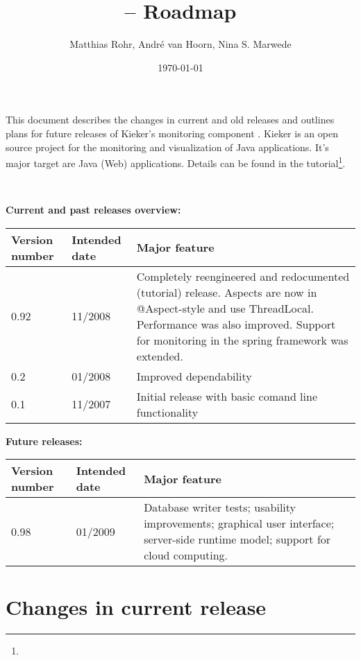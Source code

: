\documentclass{scrartcl}
\title{\kieker -- Roadmap}
\date{\today \\ \kiekerurl{roadmap.pdf}}
\author{Matthias Rohr, Andr\'{e} van Hoorn, Nina S. Marwede}
\begin{document}
\maketitle
\noindent
This document describes the changes in current and old releases and outlines plans for future releases of Kieker's monitoring component \tpmon{}. Kieker is an open source project
for the monitoring and visualization of Java applications. It's major target are Java (Web) applications. Details can be found in the tutorial\footnote{\kiekertutorialurl}.

\

\noindent \large{\textbf{Current and past releases overview:}}
\begin{center}%
 \begin{tabular}{|l|l|p{8cm}|} \hline
\textbf{Version number} & \textbf{Intended date} & \textbf{Major feature} \\ \hline
0.92 & 11/2008 & Completely reengineered and redocumented (tutorial) release. Aspects are now in @Aspect-style and use ThreadLocal. Performance was also improved. Support for monitoring in the spring framework was extended.\\ \hline
0.2 & 01/2008 & Improved dependability \\ \hline
0.1 & 11/2007 & Initial release with basic comand line functionality \\ \hline
\end{tabular}
\end{center}

\noindent \large{\textbf{Future releases:}}
\begin{center}%
 \begin{tabular}{|l|l|p{8cm}|} \hline
\textbf{Version number} & \textbf{Intended date} & \textbf{Major feature} \\ \hline
0.98 & 01/2009 & Database writer tests; usability improvements; graphical user interface; server-side runtime model; support for cloud computing.\\ \hline
\end{tabular}
\end{center}



\section{Changes in current release}
\end{document}
